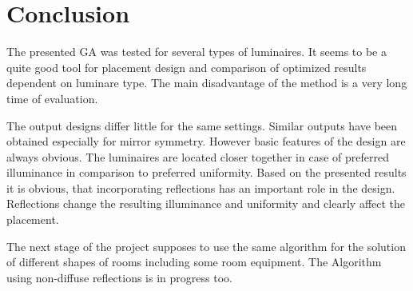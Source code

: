 \section{Conclusion}

The presented GA was tested for several types of luminaires. It seems to be a quite good tool for placement design and comparison of optimized results dependent on luminare type. The main disadvantage of the method is a very long time of evaluation.

The output designs differ little for the same settings. Similar outputs have been obtained especially for mirror symmetry. However basic features of the design are always obvious. The luminaires are located closer together in case of preferred illuminance in comparison to preferred uniformity.
\newpage
Based on the presented results it is obvious, that incorporating reflections has an important role in the design. Reflections change the resulting illuminance and uniformity and clearly affect the placement.

The next stage of the project supposes to use the same algorithm for the solution of different shapes of rooms including some room equipment. The Algorithm using non-diffuse reflections is in progress too.